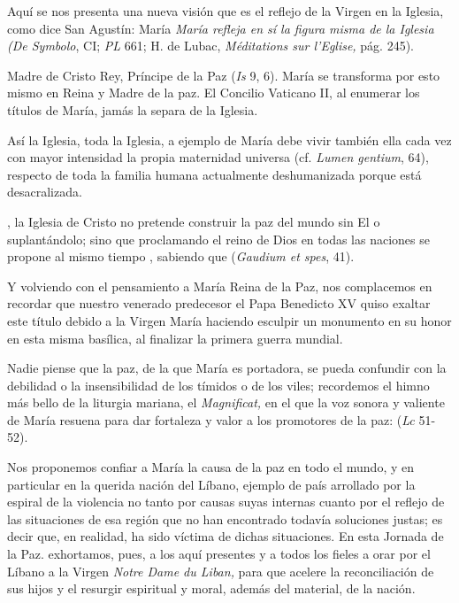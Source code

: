 \begin{body}
	Aquí se nos presenta una nueva visión que es el reflejo de la Virgen en la Iglesia, como dice San Agustín: María \emph{ María refleja en sí la figura misma de la Iglesia} \emph{(De Symbolo}, CI; \emph{PL} 661; H. de Lubac, \emph{Méditations sur l'Eglise,} pág. 245).
	
	Madre de Cristo Rey, Príncipe de la Paz (\emph{Is} 9, 6). María se transforma por esto mismo en Reina y Madre de la paz. El Concilio Vaticano II, al enumerar los títulos de María, jamás la separa de la Iglesia.
	
	Así la Iglesia, toda la Iglesia, a ejemplo de María debe vivir también ella cada vez con mayor intensidad la propia maternidad universa (cf. \emph{Lumen gentium}, 64), respecto de toda la familia humana actualmente deshumanizada porque está desacralizada.
	
	, la Iglesia de Cristo no pretende construir la paz del mundo sin El o suplantándolo; sino que proclamando el reino de Dios en todas las naciones se propone al mismo tiempo , sabiendo que  (\emph{Gaudium et spes}, 41).
	
	Y volviendo con el pensamiento a María Reina de la Paz, nos complacemos en recordar que nuestro venerado predecesor el Papa Benedicto XV quiso exaltar este título debido a la Virgen María haciendo esculpir un monumento en su honor en esta misma basílica, al finalizar la primera guerra mundial.
	
	Nadie piense que la paz, de la que María es portadora, se pueda confundir con la debilidad o la insensibilidad de los tímidos o de los viles; recordemos el himno más bello de la liturgia mariana, el \emph{Magnificat,} en el que la voz sonora y valiente de María resuena para dar fortaleza y valor a los promotores de la paz:  (\emph{Lc} 51-52).
	
	Nos proponemos confiar a María la causa de la paz en todo el mundo, y en particular en la querida nación del Líbano, ejemplo de país arrollado por la espiral de la violencia no tanto por causas suyas internas cuanto por el reflejo de las situaciones de esa región que no han encontrado todavía soluciones justas; es decir que, en realidad, ha sido víctima de dichas situaciones. En esta Jornada de la Paz. exhortamos, pues, a los aquí presentes y a todos los fieles a orar por el Líbano a la Virgen \emph{Notre Dame du Liban,} para que acelere la reconciliación de sus hijos \emph{} y el resurgir espiritual y moral, además del material, de la nación.
	

\end{body}
